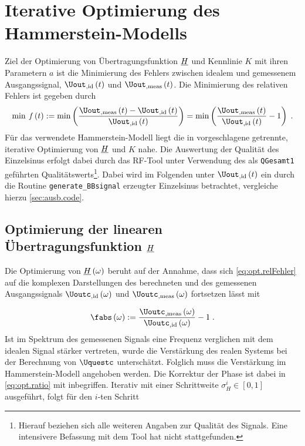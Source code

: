 \documentclass[../Report.tex]{subfiles}
\begin{document}
\chapter{Iterative Optimierung des Hammerstein-Modells}
\label{chap:opt}

Ziel der Optimierung von Übertragungsfunktion $\underline{H}$ und Kennlinie $K$ mit ihren Parametern $a$ ist die Minimierung des Fehlers zwischen idealem und gemessenem Ausgangssignal, $\Uout_{, \mathrm{id}} \oft$ und $\Uout_{, \mathrm{meas}} \oft$. Die Minimierung des relativen Fehlers ist gegeben durch
\begin{align}
\label{eq:opt.relFehler}
	\min \; \mathit{f} \oft := \min \left( \frac{\Uout_{, \mathrm{meas}} \oft  - \Uout_{, \mathrm{id}} \oft}{ \Uout_{, \mathrm{id}} \oft} \right) 
	= \min \left( \frac{ \Uout_{, \mathrm{meas}}\oft}{ \Uout_{, \mathrm{id}}\oft} -1 \right) 
	\; .
\end{align}
Für das verwendete Hammerstein-Modell liegt die in \cite{harzheim18}
vorgeschlagene getrennte, iterative Optimierung von $\underline{H}$ und $K$ nahe. 
Die Auswertung der Qualität des Einzelsinus erfolgt dabei durch das RF-Tool \cite{RF-Tool} unter Verwendung des als \lstinline{QGesamt1} geführten Qualitätswerts\footnote{\label{foot:opt.H.quality} Hierauf beziehen sich alle weiteren Angaben zur Qualität des Signals. Eine intensivere Befassung mit dem Tool hat nicht stattgefunden.}.
Dabei wird im Folgenden unter $\Uout_{, \mathrm{id}} \oft$ ein durch die Routine \lstinline{generate_BBsignal} erzeugter Einzelsinus betrachtet, vergleiche hierzu \ref{sec:ausb.code}. 

\section{Optimierung der linearen Übertragungsfunktion $\underline{H}$}
\label{sec:opt.H}

Die Optimierung von $\underline{H} \left( \omega \right)$ beruht auf der Annahme, dass sich \eqref{eq:opt.relFehler} auf die komplexen Darstellungen des berechneten und des gemessenen Ausgangssignals $\Uoutc_{, \mathrm{id}} \ofomega $ und $\Uoutc_{, \mathrm{meas}} \ofomega $ fortsetzen lässt mit 

\begin{align}
\label{eq:opt.ratio}
	\fabs \ofomega :=  
				\frac{ \Uoutc_{, \mathrm{meas}} \ofomega }{\Uoutc_{, \mathrm{id}} \ofomega } -1
				\; .
\end{align}
Ist im Spektrum des gemessenen Signals eine Frequenz verglichen mit dem idealen Signal stärker vertreten, wurde die Verstärkung des realen Systems bei der Berechnung von $\Uquestc$ unterschätzt. Folglich muss die Verstärkung im Hammerstein-Modell angehoben werden. Die Korrektur der Phase ist dabei in \eqref{eq:opt.ratio} mit inbegriffen.
Iterativ mit einer Schrittweite $\sigma_H^i \in \left[ 0 , 1 \right]$ ausgeführt, folgt für den $i$-ten Schritt
\end{document}
